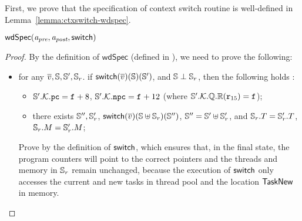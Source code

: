 First, we prove that the specification of
context switch routine is well-defined in
Lemma~\ref{lemma:ctxswitch-wdspec}.
\begin{lemma}
    \em
    \label{lemma:ctxswitch-wdspec}
    $\textsf{wdSpec}({\textit{a}_\textit{pre}}, {\textit{a}_\textit{post}}, {\mathsf{switch}})$
\end{lemma}
\begin{proof}
    By the definition of
    $\textsf{wdSpec}$ (defined in
    \Def{\ref{def:well-defined specification}}),
    we need to prove the following:
    \begin{itemize}
        \item for any $\overline{v}, \mathbb{S}, \mathbb{S}', \mathbb{S}_r$.
        if $\mathsf{switch}(\overline{v})(\mathbb{S})(\mathbb{S}')$, and
        $\mathbb{S} \perp \mathbb{S}_r$,
        then the following holds :
        \begin{itemize}
            \small
            \item $\mathbb{S}'.\mathcal{K}.\texttt{pc} = \texttt{f}_{} + 8$,
                $\mathbb{S}'.\mathcal{K}.\texttt{npc} = \texttt{f}_{} + 12$
                (where $\mathbb{S}'.\mathcal{K}.\mathbb{Q}.\mathbb{R}
                    ({\texttt{r}_{15}}) = \texttt{f}_{}$);
            \item there exists $\mathbb{S}'', \mathbb{S}_r'$,
                $\mathsf{switch}(\overline{v})(\mathbb{S} \uplus \mathbb{S}_r)
                    (\mathbb{S}'')$, $\mathbb{S}'' = \mathbb{S}' \uplus \mathbb{S}_r'$,
                and $\mathbb{S}_r.T = \mathbb{S}_r'.T$,
                $\mathbb{S}_r.M = \mathbb{S}_r'.M$;
        \end{itemize}

        Prove by the definition of $\mathsf{switch}$, which
        ensures that, in the final state,
        the program counters will point to
        the correct pointers and the threads and
        memory in $\mathbb{S}_r$ remain unchanged,
        because the execution of $\mathsf{switch}$ only accesses
        the current and new tasks in thread pool
        and the location $\mathsf{TaskNew}$ in memory.



\end{itemize}
\end{proof}
